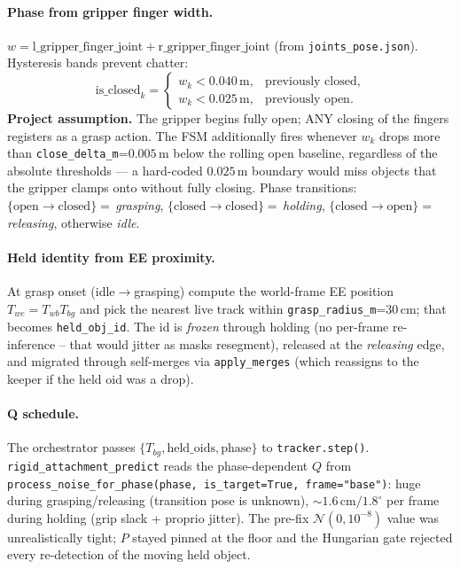 \documentclass[11pt]{article}
\newcommand{\Norm}{\mathcal{N}}
\newcommand{\code}[1]{\texttt{\small #1}}
\begin{document}
\paragraph{Phase from gripper finger width.}
$w\!=\!\text{l\_gripper\_finger\_joint}+\text{r\_gripper\_finger\_joint}$ (from
\code{joints\_pose.json}). Hysteresis bands prevent chatter:
\begin{equation*}
   \text{is\_closed}_k =
   \begin{cases}
      w_k < 0.040\,\text{m}, & \text{previously closed}, \\
      w_k < 0.025\,\text{m}, & \text{previously open}.
   \end{cases}
\end{equation*}
\textbf{Project assumption.} The gripper begins fully open; ANY closing
of the fingers registers as a grasp action. The FSM additionally fires
whenever $w_k$ drops more than \code{close\_delta\_m}=$0.005$\,m below
the rolling open baseline, regardless of the absolute thresholds — a
hard-coded $0.025$\,m boundary would miss objects that the gripper
clamps onto without fully closing. Phase transitions:
$\{\text{open}\!\to\!\text{closed}\}=$\,\emph{grasping},
$\{\text{closed}\!\to\!\text{closed}\}=$\,\emph{holding},
$\{\text{closed}\!\to\!\text{open}\}=$\,\emph{releasing},
otherwise \emph{idle}.

\paragraph{Held identity from EE proximity.}
At grasp onset (idle$\to$grasping) compute the world-frame EE position
$T_{we}\!=\!T_{wb}T_{bg}$ and pick the nearest live track within
\code{grasp\_radius\_m}=30\,cm; that becomes \code{held\_obj\_id}.
The id is \emph{frozen} through holding (no per-frame re-inference --
that would jitter as masks resegment), released at the
\emph{releasing} edge, and migrated through self-merges via
\code{apply\_merges} (which reassigns to the keeper if the held oid
was a drop).

\paragraph{Q schedule.}
The orchestrator passes $\{T_{bg}, \text{held\_oids}, \text{phase}\}$ to
\code{tracker.step()}. \code{rigid\_attachment\_predict} reads the
phase-dependent $Q$ from \code{process\_noise\_for\_phase(phase,
is\_target=True, frame="base")}: huge during grasping/releasing
(transition pose is unknown), $\sim\!1.6\,\text{cm}/1.8^\circ$ per frame
during holding (grip slack + proprio jitter). The pre-fix
$\Norm(0,10^{-8})$ value was unrealistically tight; $P$ stayed pinned
at the floor and the Hungarian gate rejected every re-detection of
the moving held object.
\end{document}
